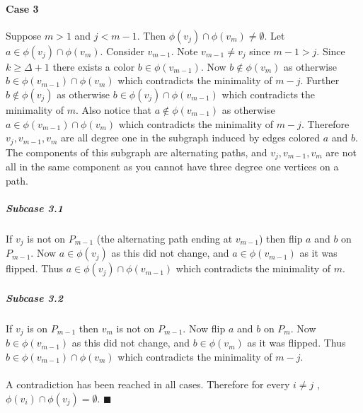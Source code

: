 \documentclass[letterpaper,12pt,oneside,onecolumn]{report}
\begin{document}
\paragraph{Case 3}
Suppose $m >1$ and $j < m-1$. Then $\phi(v_{j}) \cap \phi(v_m) \neq \emptyset$. Let $a \in \phi(v_{j}) \cap \phi(v_m)$. Consider $v_{m-1}$. Note $v_{m-1} \neq v_j$ since $m-1 > j$. Since $k \geq \Delta + 1$ there exists a color $b \in \phi(v_{m-1})$. Now $b \not\in \phi(v_m)$ as otherwise $b \in \phi(v_{m-1}) \cap \phi(v_m)$ which contradicts the minimality of $m-j$. Further $b \not\in \phi(v_j)$ as otherwise $b\in \phi(v_j) \cap \phi(v_{m-1})$ which contradicts the minimality of $m$. Also notice that $a \not\in \phi(v_{m-1})$ as otherwise $a \in \phi(v_{m-1}) \cap \phi(v_m)$ which contradicts the minimality of $m - j$. Therefore $v_j, v_{m-1},v_m$ are all degree one in the subgraph induced by edges colored $a$ and $b$. The components of this subgraph are alternating paths, and $v_j, v_{m-1}, v_m$ are not all in the same component as you cannot have three degree one vertices on a path.
\subparagraph{Subcase 3.1}
If $v_j$ is not on $P_{m-1}$ (the alternating path ending at $v_{m-1}$) then flip $a$ and $b$ on $P_{m-1}$. Now $a \in \phi(v_j)$ as this did not change, and $a \in \phi(v_{m-1})$ as it was flipped. Thus $a \in \phi(v_j) \cap \phi(v_{m-1})$ which contradicts the minimality of $m$.
\subparagraph{Subcase 3.2}
If $v_j$ is on $P_{m-1}$ then $v_m$ is not on $P_{m-1}$. Now flip $a$ and $b$ on $P_{m}$. Now $b \in \phi(v_{m-1})$ as this did not change, and $b \in \phi(v_m)$ as it was flipped. Thus $b \in \phi(v_{m-1}) \cap \phi(v_m)$ which contradicts the minimality of $m-j$.
\paragraph{}
A contradiction has been reached in all cases. Therefore for every $i \neq j$ , $\phi(v_i) \cap \phi(v_j) = \emptyset$. $\blacksquare$
\end{document}
